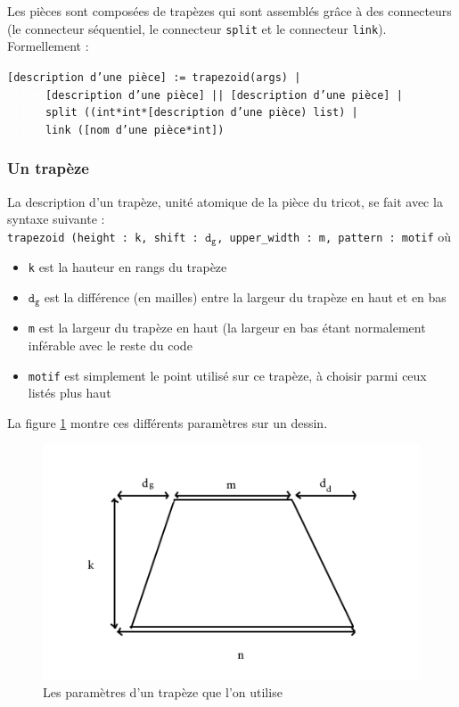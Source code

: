 \documentclass[a4paper,10pt]{article}
\begin{document}
Les pièces sont composées de trapèzes qui sont assemblés grâce à des connecteurs (le connecteur séquentiel, le connecteur 
\texttt{split} et le connecteur \texttt{link}). Formellement :
  
\noindent \texttt{[description d'une pièce] := trapezoid(args) | \\
  \textcolor{white}{alinea}[description d'une pièce] || [description d'une pièce] | \\
  \textcolor{white}{alinea}split ((int*int*[description d'une pièce) list) | \\
  \textcolor{white}{alinea}link ([nom d'une pièce*int])}

\subsubsection{Un trapèze}

  La description d'un trapèze, unité atomique de la pièce du tricot, se fait avec la syntaxe suivante : \\
\texttt{trapezoid (height : k, shift : $\mathtt{d_g}$, upper\_width : m, pattern : motif} où 
\begin{itemize}
\item \texttt{k} est la hauteur en rangs du trapèze
\item $\mathtt{d_g}$ est la différence (en mailles) entre la largeur du trapèze en haut et en bas
\item \texttt{m} est la largeur du trapèze en haut (la largeur en bas étant normalement inférable avec le reste du code
\item \texttt{motif} est simplement le point utilisé sur ce trapèze, à choisir parmi ceux listés plus haut
\end{itemize}

La figure \ref{trapeze} montre ces différents paramètres sur un dessin.

\begin{figure}[!ht]
  \centering \includegraphics[scale=0.6]{../img/trapeze.jpg}
  \caption{Les paramètres d'un trapèze que l'on utilise}
  \label{trapeze}
\end{figure}
\end{document}
